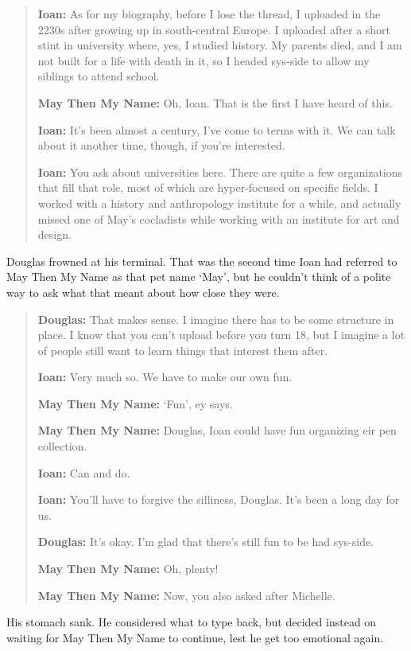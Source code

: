 \begin{quote}
\textbf{Ioan:} As for my biography, before I lose the thread, I uploaded in the 2230s after growing up in south-central Europe. I uploaded after a short stint in university where, yes, I studied history. My parents died, and I am not built for a life with death in it, so I headed sys-side to allow my siblings to attend school.

\textbf{May Then My Name:} Oh, Ioan. That is the first I have heard of this.

\textbf{Ioan:} It's been almost a century, I've come to terms with it. We can talk about it another time, though, if you're interested.

\textbf{Ioan:} You ask about universities here. There are quite a few organizations that fill that role, most of which are hyper-focused on specific fields. I worked with a history and anthropology institute for a while, and actually missed one of May's cocladists while working with an institute for art and design.
\end{quote}

\noindent Douglas frowned at his terminal. That was the second time Ioan had referred to May Then My Name as that pet name `May', but he couldn't think of a polite way to ask what that meant about how close they were.

\begin{quote}
\textbf{Douglas:} That makes sense. I imagine there has to be some structure in place. I know that you can't upload before you turn 18, but I imagine a lot of people still want to learn things that interest them after.

\textbf{Ioan:} Very much so. We have to make our own fun.

\textbf{May Then My Name:} `Fun', ey says.

\textbf{May Then My Name:} Douglas, Ioan could have fun organizing eir pen collection.

\textbf{Ioan:} Can and do.

\textbf{Ioan:} You'll have to forgive the silliness, Douglas. It's been a long day for us.

\textbf{Douglas:} It's okay. I'm glad that there's still fun to be had sys-side.

\textbf{May Then My Name:} Oh, plenty!

\textbf{May Then My Name:} Now, you also asked after Michelle.
\end{quote}

\noindent His stomach sank. He considered what to type back, but decided instead on waiting for May Then My Name to continue, lest he get too emotional again.

